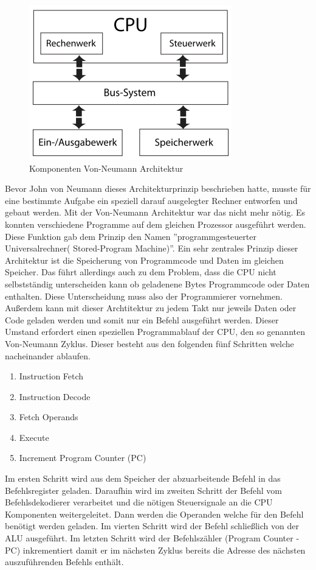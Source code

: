 \documentclass[12pt]{article}
\begin{document}
\begin{figure}[!htb]
\centering
\includegraphics[scale=0.60]{Von-Neumann_Architektur}
\caption{Komponenten Von-Neumann Architektur}
\centering
\label{fig:vonNeumann}
\end{figure}
Bevor John von Neumann dieses Architekturprinzip beschrieben hatte, musste für eine bestimmte Aufgabe ein speziell darauf ausgelegter Rechner entworfen und gebaut werden. Mit der Von-Neumann Architektur war das nicht mehr nötig. Es konnten verschiedene Programme auf dem gleichen Prozessor ausgeführt werden. Diese Funktion gab dem Prinzip den Namen ''programmgesteuerter Universalrechner( Stored-Program Machine)''\cite{TaschenbuchMikroprozessortechnik}.
Ein sehr zentrales Prinzip dieser Architektur ist die Speicherung von Programmcode und Daten im gleichen Speicher. Das führt allerdings auch zu dem Problem, dass die CPU nicht selbstständig unterscheiden kann ob geladenene Bytes Programmcode oder Daten enthalten. Diese Unterscheidung muss also der Programmierer vornehmen. Außerdem kann mit dieser Archtitektur zu jedem Takt nur jeweils Daten oder Code geladen werden und somit nur ein Befehl ausgeführt werden. Dieser Umstand erfordert einen speziellen Programmablauf der CPU, den so genannten Von-Neumann Zyklus. Dieser besteht aus den folgenden fünf Schritten welche nacheinander ablaufen.
\begin{enumerate}
\item Instruction Fetch 
\item Instruction Decode
\item Fetch Operands
\item Execute
\item Increment Program Counter (PC)
\end{enumerate}
Im ersten Schritt wird aus dem Speicher der abzuarbeitende Befehl in das Befehlsregister geladen. Daraufhin wird im zweiten Schritt der Befehl vom Befehlsdekodierer verarbeitet und die nötigen Steuersignale an die CPU Komponenten weitergeleitet. Dann werden die Operanden welche für den Befehl benötigt werden geladen. Im vierten Schritt wird der Befehl schließlich von der ALU ausgeführt. Im letzten Schritt wird der Befehlszähler (Program Counter - PC) inkrementiert damit er im nächsten Zyklus bereits die Adresse des nächsten auszuführenden Befehls enthält.
\end{document}
